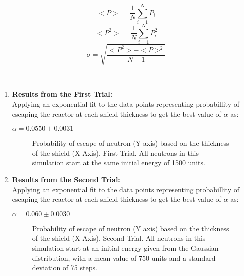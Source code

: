 \documentclass[12pt]{article}
\begin{document}
\begin{equation}
    <P> = \frac{1}{N} \sum_{i=1}^{N} P_i
\end{equation}
\begin{equation}
    <P^2> = \frac{1}{N} \sum_{i=1}^{N} P_i^2
\end{equation}
\begin{equation}
    \sigma = \sqrt{\frac{<P^2> - <P>^2}{N-1}}
\end{equation}

\vskip0.1in
\\
\begin{enumerate}
    \item \textbf{Results from the First Trial:}\\
    Applying an exponential fit to the data points representing probabillity of escaping the reactor at each shield thickness to get the best value of $\alpha$ as:
    \begin{center}
        $\alpha = 0.0550 \pm 0.0031$
    \end{center}
    
\begin{figure}[h!]
\begin{center}
\end{center}
\caption{Probability of escape of neutron (Y axis) based on the thickness of the shield (X Axis). First Trial. All neutrons in this simulation start at the same initial energy of 1500 units. }
\end{figure}

\clearpage


    \item \textbf{Results from the Second Trial:}\\
    Applying an exponential fit to the data points representing probabillity of escaping the reactor at each shield thickness to get the best value of $\alpha$ as:
    \begin{center}
        $\alpha = 0.060 \pm 0.0030$
    \end{center}

\begin{figure}[h!]
\begin{center}
\end{center}
\caption{Probability of escape of neutron (Y axis) based on the thickness of the shield (X Axis). Second Trial. All neutrons in this simulation start at an initial energy given from the Gaussian distribution, with a mean value of 750 units and a standard deviation of 75 steps. } 
\end{figure}

\end{enumerate}
\end{document}
